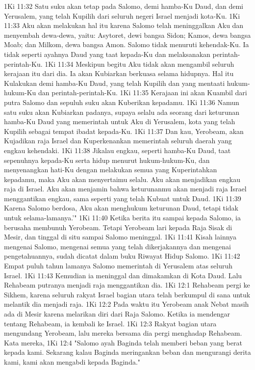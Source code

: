 1Ki 11:32  Satu suku akan tetap pada Salomo, demi hamba-Ku Daud, dan demi Yerusalem, yang telah Kupilih dari seluruh negeri Israel menjadi kota-Ku.
1Ki 11:33  Aku akan melakukan hal itu karena Salomo telah meninggalkan Aku dan menyembah dewa-dewa, yaitu: Asytoret, dewi bangsa Sidon; Kamos, dewa bangsa Moab; dan Milkom, dewa bangsa Amon. Salomo tidak menuruti kehendak-Ku. Ia tidak seperti ayahnya Daud yang taat kepada-Ku dan melaksanakan perintah-perintah-Ku.
1Ki 11:34  Meskipun begitu Aku tidak akan mengambil seluruh kerajaan itu dari dia. Ia akan Kubiarkan berkuasa selama hidupnya. Hal itu Kulakukan demi hamba-Ku Daud, yang telah Kupilih dan yang mentaati hukum-hukum-Ku dan perintah-perintah-Ku.
1Ki 11:35  Kerajaan ini akan Kuambil dari putra Salomo dan sepuluh suku akan Kuberikan kepadamu.
1Ki 11:36  Namun satu suku akan Kubiarkan padanya, supaya selalu ada seorang dari keturunan hamba-Ku Daud yang memerintah untuk Aku di Yerusalem, kota yang telah Kupilih sebagai tempat ibadat kepada-Ku.
1Ki 11:37  Dan kau, Yerobeam, akan Kujadikan raja Israel dan Kuperkenankan memerintah seluruh daerah yang engkau kehendaki.
1Ki 11:38  Jikalau engkau, seperti hamba-Ku Daud, taat sepenuhnya kepada-Ku serta hidup menurut hukum-hukum-Ku, dan menyenangkan hati-Ku dengan melakukan semua yang Kuperintahkan kepadamu, maka Aku akan menyertaimu selalu. Aku akan menjadikan engkau raja di Israel. Aku akan menjamin bahwa keturunanmu akan menjadi raja Israel menggantikan engkau, sama seperti yang telah Kubuat untuk Daud.
1Ki 11:39  Karena Salomo berdosa, Aku akan menghukum keturunan Daud, tetapi tidak untuk selama-lamanya.'"
1Ki 11:40  Ketika berita itu sampai kepada Salomo, ia berusaha membunuh Yerobeam. Tetapi Yerobeam lari kepada Raja Sisak di Mesir, dan tinggal di situ sampai Salomo meninggal.
1Ki 11:41  Kisah lainnya mengenai Salomo, mengenai semua yang telah dikerjakannya dan mengenai pengetahuannya, sudah dicatat dalam buku Riwayat Hidup Salomo.
1Ki 11:42  Empat puluh tahun lamanya Salomo memerintah di Yerusalem atas seluruh Israel.
1Ki 11:43  Kemudian ia meninggal dan dimakamkan di Kota Daud. Lalu Rehabeam putranya menjadi raja menggantikan dia.
1Ki 12:1  Rehabeam pergi ke Sikhem, karena seluruh rakyat Israel bagian utara telah berkumpul di sana untuk melantik dia menjadi raja.
1Ki 12:2  Pada waktu itu Yerobeam anak Nebat masih ada di Mesir karena melarikan diri dari Raja Salomo. Ketika ia mendengar tentang Rehabeam, ia kembali ke Israel.
1Ki 12:3  Rakyat bagian utara mengundang Yerobeam, lalu mereka bersama dia pergi menghadap Rehabeam. Kata mereka,
1Ki 12:4  "Salomo ayah Baginda telah memberi beban yang berat kepada kami. Sekarang kalau Baginda meringankan beban dan mengurangi derita kami, kami akan mengabdi kepada Baginda."
